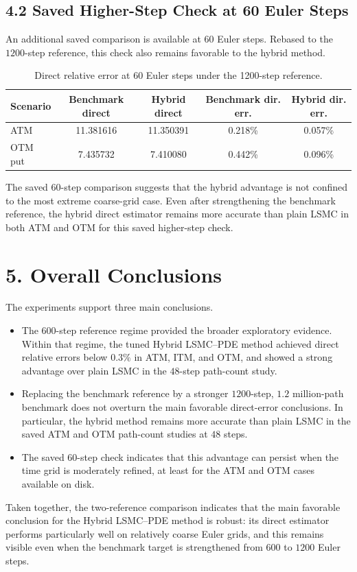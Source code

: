 \documentclass[11pt,a4paper]{article}
\begin{document}
\subsection*{4.2 Saved Higher-Step Check at 60 Euler Steps}

An additional saved comparison is available at \(60\) Euler steps. Rebased to the \(1200\)-step reference, this check also remains favorable to the hybrid method.

\begin{table}[h!]
\centering
\caption{Direct relative error at 60 Euler steps under the 1200-step reference.}
\begin{tabular}{lcccc}
\toprule
Scenario & Benchmark direct & Hybrid direct & Benchmark dir. err. & Hybrid dir. err. \\
\midrule
ATM & 11.381616 & 11.350391 & 0.218\% & 0.057\% \\
OTM put & 7.435732 & 7.410080 & 0.442\% & 0.096\% \\
\bottomrule
\end{tabular}
\end{table}

The saved \(60\)-step comparison suggests that the hybrid advantage is not confined to the most extreme coarse-grid case. Even after strengthening the benchmark reference, the hybrid direct estimator remains more accurate than plain LSMC in both ATM and OTM for this saved higher-step check.

\section*{5. Overall Conclusions}

The experiments support three main conclusions.

\begin{itemize}
\item The \(600\)-step reference regime provided the broader exploratory evidence. Within that regime, the tuned Hybrid LSMC--PDE method achieved direct relative errors below \(0.3\%\) in ATM, ITM, and OTM, and showed a strong advantage over plain LSMC in the \(48\)-step path-count study.
\item Replacing the benchmark reference by a stronger \(1200\)-step, \(1.2\) million-path benchmark does not overturn the main favorable direct-error conclusions. In particular, the hybrid method remains more accurate than plain LSMC in the saved ATM and OTM path-count studies at \(48\) steps.
\item The saved \(60\)-step check indicates that this advantage can persist when the time grid is moderately refined, at least for the ATM and OTM cases available on disk.
\end{itemize}

Taken together, the two-reference comparison indicates that the main favorable conclusion for the Hybrid LSMC--PDE method is robust: its direct estimator performs particularly well on relatively coarse Euler grids, and this remains visible even when the benchmark target is strengthened from \(600\) to \(1200\) Euler steps.
\end{document}
